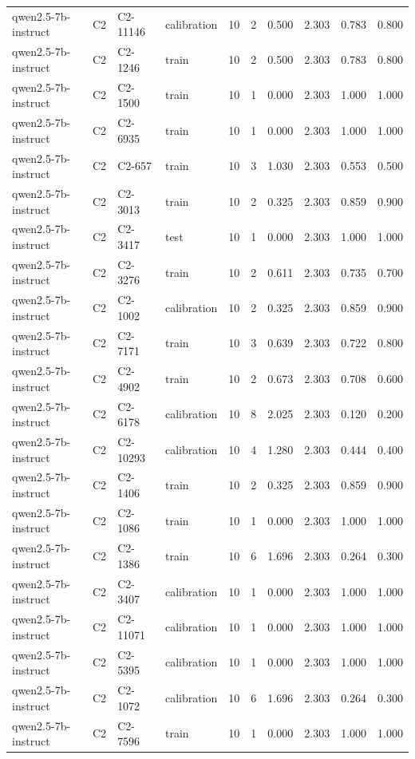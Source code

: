\begin{table}
\begin{tabular}{llllrrrrrr}
qwen2.5-7b-instruct & C2 & C2-11146 & calibration & 10 & 2 & 0.500 & 2.303 & 0.783 & 0.800 \\
qwen2.5-7b-instruct & C2 & C2-1246 & train & 10 & 2 & 0.500 & 2.303 & 0.783 & 0.800 \\
qwen2.5-7b-instruct & C2 & C2-1500 & train & 10 & 1 & 0.000 & 2.303 & 1.000 & 1.000 \\
qwen2.5-7b-instruct & C2 & C2-6935 & train & 10 & 1 & 0.000 & 2.303 & 1.000 & 1.000 \\
qwen2.5-7b-instruct & C2 & C2-657 & train & 10 & 3 & 1.030 & 2.303 & 0.553 & 0.500 \\
qwen2.5-7b-instruct & C2 & C2-3013 & train & 10 & 2 & 0.325 & 2.303 & 0.859 & 0.900 \\
qwen2.5-7b-instruct & C2 & C2-3417 & test & 10 & 1 & 0.000 & 2.303 & 1.000 & 1.000 \\
qwen2.5-7b-instruct & C2 & C2-3276 & train & 10 & 2 & 0.611 & 2.303 & 0.735 & 0.700 \\
qwen2.5-7b-instruct & C2 & C2-1002 & calibration & 10 & 2 & 0.325 & 2.303 & 0.859 & 0.900 \\
qwen2.5-7b-instruct & C2 & C2-7171 & train & 10 & 3 & 0.639 & 2.303 & 0.722 & 0.800 \\
qwen2.5-7b-instruct & C2 & C2-4902 & train & 10 & 2 & 0.673 & 2.303 & 0.708 & 0.600 \\
qwen2.5-7b-instruct & C2 & C2-6178 & calibration & 10 & 8 & 2.025 & 2.303 & 0.120 & 0.200 \\
qwen2.5-7b-instruct & C2 & C2-10293 & calibration & 10 & 4 & 1.280 & 2.303 & 0.444 & 0.400 \\
qwen2.5-7b-instruct & C2 & C2-1406 & train & 10 & 2 & 0.325 & 2.303 & 0.859 & 0.900 \\
qwen2.5-7b-instruct & C2 & C2-1086 & train & 10 & 1 & 0.000 & 2.303 & 1.000 & 1.000 \\
qwen2.5-7b-instruct & C2 & C2-1386 & train & 10 & 6 & 1.696 & 2.303 & 0.264 & 0.300 \\
qwen2.5-7b-instruct & C2 & C2-3407 & calibration & 10 & 1 & 0.000 & 2.303 & 1.000 & 1.000 \\
qwen2.5-7b-instruct & C2 & C2-11071 & calibration & 10 & 1 & 0.000 & 2.303 & 1.000 & 1.000 \\
qwen2.5-7b-instruct & C2 & C2-5395 & calibration & 10 & 1 & 0.000 & 2.303 & 1.000 & 1.000 \\
qwen2.5-7b-instruct & C2 & C2-1072 & calibration & 10 & 6 & 1.696 & 2.303 & 0.264 & 0.300 \\
qwen2.5-7b-instruct & C2 & C2-7596 & train & 10 & 1 & 0.000 & 2.303 & 1.000 & 1.000 \\

\end{tabular}
\end{table}
